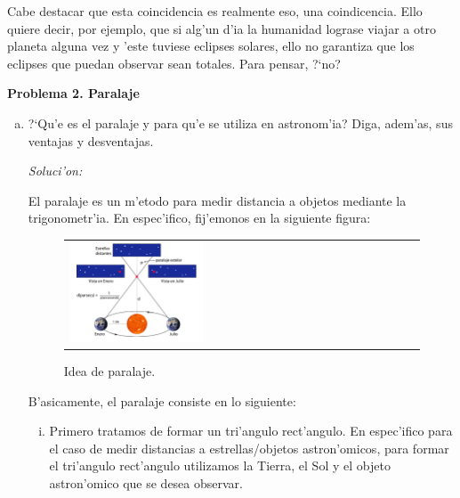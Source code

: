 \documentclass{article}
\begin{document}
Cabe destacar que esta coincidencia es realmente eso, una coindicencia. Ello quiere decir, por ejemplo, que si alg'un d'ia la humanidad lograse viajar a otro planeta alguna vez y 'este tuviese eclipses solares, ello no garantiza que los eclipses que puedan observar sean totales. Para pensar, ?`no? 
\vspace{3mm}

\textbf{Problema 2. Paralaje}

\begin{enumerate} [a)]

\item ?`Qu'e es el paralaje y para qu'e se utiliza en astronom'ia? Diga, adem'as, sus ventajas y desventajas.

\vspace{2mm}

\textit{Soluci'on:}

\vspace{2mm}

El paralaje es un m'etodo para medir distancia a objetos mediante la trigonometr'ia. En espec'ifico, fij'emonos en la siguiente figura:

\newpage

\begin{figure}[!ht]
\begin{center}
\begin{tabular}{ll}
  \includegraphics[width=0.4\textwidth]{paralaje.png} 
\end{tabular}
\caption{{\small Idea de paralaje.}}\label{fig2}
\end{center} 
\end{figure}

B'asicamente, el paralaje consiste en lo siguiente:

\begin{enumerate} [i)]
\item Primero tratamos de formar un tri'angulo rect'angulo. En espec'ifico para el caso de medir distancias a estrellas/objetos astron'omicos, para formar el tri'angulo rect'angulo utilizamos la Tierra,  el Sol y el objeto astron'omico que se desea observar.


\end{enumerate}
\end{enumerate}
\end{document}
